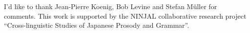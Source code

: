 \documentclass[output=paper
                ,modfonts
 	        ,biblatex
                ,babelshorthands
                ,newtxmath
                ,draftmode
                ,colorlinks, citecolor=brown
]{langscibook}
\begin{document}
\section*{\acknowledgmentsUS}

I'd like to thank Jean-Pierre Koenig, Bob Levine and Stefan Müller
for comments. This work is supported by the NINJAL collaborative
research project ``Cross-linguistic Studies of Japanese Prosody and Grammar''.

{\sloppy
\printbibliography[heading=subbibliography,notkeyword=this] 
}
\end{document}
